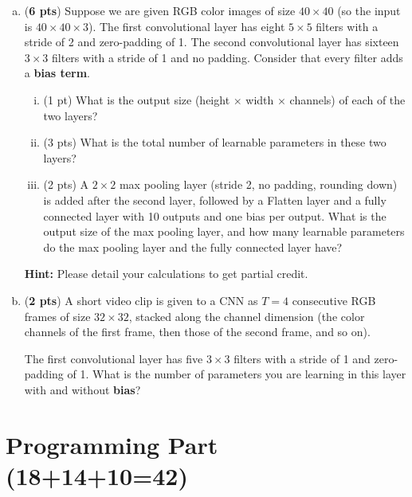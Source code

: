 \documentclass[11pt]{exam}
\begin{document}
\begin{enumerate}[1.]
\begin{enumerate}[(a)]
\item ({\bf 6 pts}) Suppose we are given RGB color images of size $40\times 40$ (so the input is $40 \times 40 \times 3$). The first convolutional layer has eight $5 \times 5$ filters with a stride of 2 and zero-padding of 1. The second convolutional layer has sixteen $3 \times 3$ filters with a stride of 1 and no padding. Consider that every filter adds a \textbf{bias term}.
\begin{enumerate}[(i)]
    \item (1 pt) What is the output size (height $\times$ width $\times$ channels) of each of the two layers?
    \item (3 pts) What is the total number of learnable parameters in these two layers?
    \item (2 pts) A $2 \times 2$ max pooling layer (stride 2, no padding, rounding down) is added after the second layer, followed by a Flatten layer and a fully connected layer with 10 outputs and one bias per output. What is the output size of the max pooling layer, and how many learnable parameters do the max pooling layer and the fully connected layer have?
\end{enumerate}
{\bf Hint:} Please detail your calculations to get partial credit.
\begin{tcolorbox}
\vspace{55ex}
\end{tcolorbox}

\clearpage

\item ({\bf 2 pts}) A short video clip is given to a CNN as $T = 4$ consecutive RGB frames of size $32 \times 32$, stacked along the channel dimension (the color channels of the first frame, then those of the second frame, and so on).

The first convolutional layer has five $3 \times 3$ filters with a stride of 1 and zero-padding of 1. What is the number of parameters you are learning in this layer with and without \textbf{bias}?  \\

\begin{tcolorbox}
\vspace{30ex}
\end{tcolorbox}


\end{enumerate}
\end{enumerate}

\clearpage

\section*{Programming Part (18+14+10=42)} 
\end{document}
